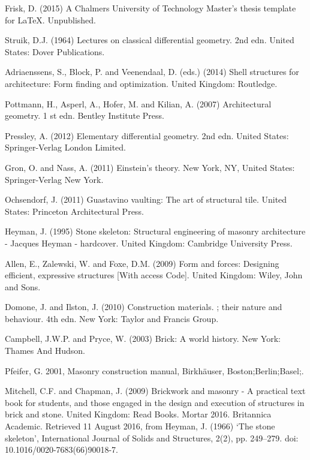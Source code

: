
\begin{thebibliography}{69}

 Frisk, D. (2015) A Chalmers University of Technology Master's thesis template for \LaTeX . Unpublished.

 Struik, D.J. (1964) Lectures on classical differential geometry. 2nd edn. United States: Dover Publications.

Adriaenssens, S., Block, P. and Veenendaal, D. (eds.) (2014) Shell structures for architecture: Form finding and optimization. United Kingdom: Routledge.

Pottmann, H., Asperl, A., Hofer, M. and Kilian, A. (2007) Architectural geometry. 1 st edn. Bentley Institute Press.

 Pressley, A. (2012) Elementary differential geometry. 2nd edn. United States: Springer-Verlag London Limited.

Gron, O. and Nass, A. (2011) Einstein’s theory. New York, NY, United States: Springer-Verlag New York.

Ochsendorf, J. (2011) Guastavino vaulting: The art of structural tile. United States: Princeton Architectural Press.

Heyman, J. (1995) Stone skeleton: Structural engineering of masonry architecture - Jacques Heyman - hardcover. United Kingdom: Cambridge University Press.

Allen, E., Zalewski, W. and Foxe, D.M. (2009) Form and forces: Designing efficient, expressive structures [With access Code]. United Kingdom: Wiley, John and Sons.

Domone, J. and Ilston, J. (2010) Construction materials. ; their nature and behaviour. 4th edn. New York: Taylor and Francis Group.

Campbell, J.W.P. and Pryce, W. (2003) Brick: A world history. New York: Thames And Hudson.

Pfeifer, G. 2001, Masonry construction manual, Birkhäuser, Boston;Berlin;Basel;.

Mitchell, C.F. and Chapman, J. (2009) Brickwork and masonry - A practical text book for students, and those engaged in the design and execution of structures in brick and stone. United Kingdom: Read Books.
Mortar 2016. Britannica Academic. Retrieved 11 August 2016, from
Heyman, J. (1966) ‘The stone skeleton’, International Journal of Solids and Structures, 2(2), pp. 249–279. doi: 10.1016/0020-7683(66)90018-7.


\end{thebibliography}
